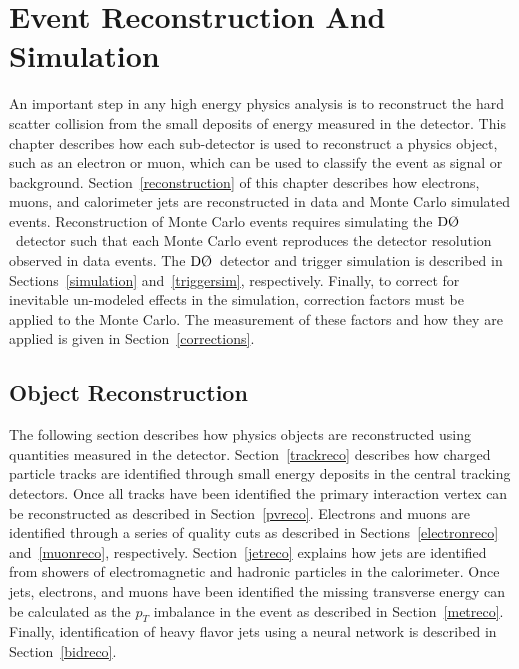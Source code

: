 \chapter{Event Reconstruction And Simulation}
\label{EventSelection}
\label{recosim}

An important step in any high energy physics analysis is to reconstruct the hard scatter collision from the small deposits of energy measured in the detector. This chapter describes how each sub-detector is used to reconstruct a physics object, such as an electron or muon, which can be used to classify the event as signal or background. Section~\ref{reconstruction} of this chapter describes how electrons, muons, and calorimeter jets are reconstructed in data and Monte Carlo simulated events. Reconstruction of Monte Carlo events requires simulating the $\dzero$~detector such that each Monte Carlo event reproduces the detector resolution observed in data events. The $\dzero$~detector and trigger simulation is described in Sections~\ref{simulation} and~\ref{triggersim}, respectively. Finally, to correct for inevitable un-modeled effects in the simulation, correction factors must be applied to the Monte Carlo. The measurement of these factors and how they are applied is given in Section~\ref{corrections}.

\section{Object Reconstruction}
\label{objectreco}

The following section describes how physics objects are reconstructed using quantities measured in the detector. Section~\ref{trackreco} describes how charged particle tracks are identified through small energy deposits in the central tracking detectors. Once all tracks have been identified the primary interaction vertex can be reconstructed as described in Section~\ref{pvreco}. Electrons and muons are identified through a series of quality cuts as described in Sections~\ref{electronreco} and~\ref{muonreco}, respectively. Section~\ref{jetreco} explains how jets are identified from showers of electromagnetic and hadronic particles in the calorimeter. Once jets, electrons, and muons have been identified the missing transverse energy can be calculated as the $p_{T}$ imbalance in the event as described in Section~\ref{metreco}. Finally, identification of heavy flavor jets using a neural network is described in Section~\ref{bidreco}.

\label{reconstruction}
